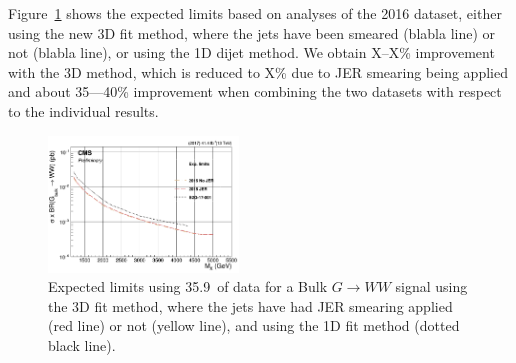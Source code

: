 Figure~\ref{fig:limitsCompare} shows the expected limits based on analyses of the 2016 dataset, either using the new 3D fit method, where the jets have been smeared (blabla line) or not (blabla line), or using the 1D dijet method. We obtain X--X\% improvement with the 3D method, which is reduced to X\% due to JER smearing being applied and about 35---40\% improvement when combining the two datasets with respect to the individual results.
\begin{figure}[h!]
\centering
\includegraphics[width=0.45\textwidth]{figures/analysis/search3/AN-17-303/limits/limits_BulkGWW_compare.png}
\caption{Expected limits using 35.9~\fbinv of data for a Bulk $G\rightarrow WW$ signal using the 3D fit method, where the jets have had JER smearing applied (red line) or not (yellow line), and using the 1D fit method (dotted black line).}
\label{fig:limitsCompare}
\end{figure}

